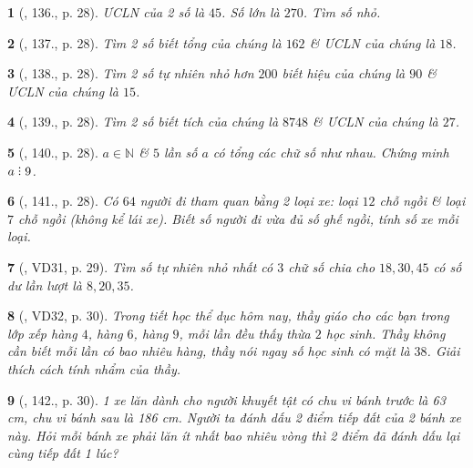 \documentclass{article}
\newtheorem{baitoan}{}
\DeclareRobustCommand{\divby}{%
	\mathrel{\vbox{\baselineskip.65ex\lineskiplimit0pt\hbox{.}\hbox{.}\hbox{.}}}%
}
\begin{document}
\begin{baitoan}[\cite{Tuyen_Toan_6}, 136., p. 28]
	{\rm ƯCLN} của 2 số là $45$. Số lớn là $270$. Tìm số nhỏ.
\end{baitoan}

\begin{baitoan}[\cite{Tuyen_Toan_6}, 137., p. 28]
	Tìm 2 số biết tổng của chúng là $162$ \& {\rm ƯCLN} của chúng là $18$.
\end{baitoan}

\begin{baitoan}[\cite{Tuyen_Toan_6}, 138., p. 28]
	Tìm 2 số tự nhiên nhỏ hơn $200$ biết hiệu của chúng là $90$ \& {\rm ƯCLN} của chúng là $15$.
\end{baitoan}

\begin{baitoan}[\cite{Tuyen_Toan_6}, 139., p. 28]
	Tìm 2 số biết tích của chúng là $8748$ \& {\rm ƯCLN} của chúng là $27$.
\end{baitoan}

\begin{baitoan}[\cite{Tuyen_Toan_6}, 140., p. 28]
	$a\in\mathbb{N}$ \& $5$ lần số $a$ có tổng các chữ số như nhau. Chứng minh $a\divby9$.
\end{baitoan}

\begin{baitoan}[\cite{Tuyen_Toan_6}, 141., p. 28]
	Có $64$ người đi tham quan bằng 2 loại xe: loại $12$ chỗ ngồi \& loại $7$ chỗ ngồi (không kể lái xe). Biết số người đi vừa đủ số ghế ngồi, tính số xe mỗi loại.
\end{baitoan}

\begin{baitoan}[\cite{Tuyen_Toan_6}, VD31, p. 29]
	Tìm số tự nhiên nhỏ nhất có $3$ chữ số chia cho $18,30,45$ có số dư lần lượt là $8,20,35$.
\end{baitoan}

\begin{baitoan}[\cite{Tuyen_Toan_6}, VD32, p. 30]
	Trong tiết học thể dục hôm nay, thầy giáo cho các bạn trong lớp xếp hàng $4$, hàng $6$, hàng $9$, mỗi lần đều thấy thừa $2$ học sinh. Thầy không cần biết mỗi lần có bao nhiêu hàng, thầy nói ngay số học sinh có mặt là $38$. Giải thích cách tính nhẩm của thầy.
\end{baitoan}

\begin{baitoan}[\cite{Tuyen_Toan_6}, 142., p. 30]
	1 xe lăn dành cho người khuyết tật có chu vi bánh trước là {\rm63 cm}, chu vi bánh sau là {\rm186 cm}. Người ta đánh dấu 2 điểm tiếp đất của 2 bánh xe này. Hỏi mỗi bánh xe phải lăn ít nhất bao nhiêu vòng thì 2 điểm đã đánh dấu lại cùng tiếp đất 1 lúc?
\end{baitoan}
\end{document}
